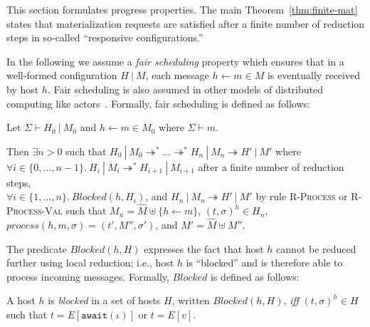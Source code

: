 This section formulates progress properties. The main
Theorem~\ref{thm:finite-mat} states that materialization requests are
satisfied after a finite number of reduction steps in so-called
``responsive configurations.''

In the following we assume a {\em fair scheduling} property which
ensures that in a well-formed configuration $H~|~M$, each message $h
\leftarrow m \in M$ is eventually received by host $h$. Fair
scheduling is also assumed in other models of distributed computing
like actors~\cite{Actors,Talcott}. Formally, fair scheduling is
defined as follows:

\begin{defn}\label{def:fair-scheduling}
  Let $\Sigma \vdash H_0~|~M_0$ and $h \leftarrow m \in M_0$ where
  $\Sigma \vdash m$.

  Then $\exists n > 0$ such that $H_0~|~M_0 \twoheadrightarrow^*
  \ldots \twoheadrightarrow^* H_n~|~M_n \twoheadrightarrow H'~|~M'$
  where \\$\forall i \in \{ 0, \ldots, n-1 \}.~H_i~|~M_i
  \twoheadrightarrow^* H_{i+1}~|~M_{i+1}$ after a finite number of
  reduction steps, \\$\forall i \in \{ 1, \ldots, n
  \}.~\mathit{Blocked}(h, H_i)$, and $H_n~|~M_n \twoheadrightarrow
  H'~|~M'$ by rule \textsc{R-Process} or \textsc{R-Process-Val} such
  that $M_n = \hat{M} \uplus \{ h \leftarrow m \}$, $(t, \sigma)^h \in
  H_n$, $process(h, m, \sigma) = (t', M'', \sigma')$, and $M' =
  \hat{M} \uplus M''$.
\end{defn}

The predicate $\mathit{Blocked}(h, H)$ expresses the fact that host
$h$ cannot be reduced further using local reduction; i.e., host $h$ is
``blocked'' and is therefore able to process incoming
messages. Formally, $\mathit{Blocked}$ is defined as follows:

\begin{defn}\label{def:blocked-host}
  A host $h$ is {\em blocked} in a set of hosts $H$, written
  $\mathit{Blocked}(h, H)$, {\em iff} $(t, \sigma)^h \in H$ such that
  $t = E[\texttt{await}(\iota)]$ or $t = E[v]$.
\end{defn}
